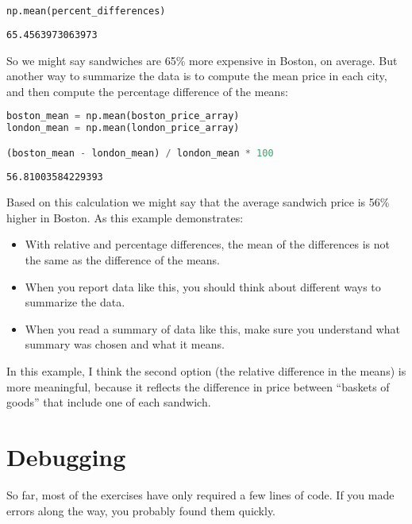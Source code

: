 \begin{lstlisting}[language=Python,style=source]
np.mean(percent_differences)
\end{lstlisting}

\begin{lstlisting}[style=output]
65.4563973063973
\end{lstlisting}

So we might say sandwiches are 65\% more expensive in Boston, on
average. But another way to summarize the data is to compute the mean
price in each city, and then compute the percentage difference of the
means:

\begin{lstlisting}[language=Python,style=source]
boston_mean = np.mean(boston_price_array)
london_mean = np.mean(london_price_array)

(boston_mean - london_mean) / london_mean * 100
\end{lstlisting}

\begin{lstlisting}[style=output]
56.81003584229393
\end{lstlisting}

Based on this calculation we might say that the average sandwich price
is 56\% higher in Boston. As this example demonstrates:

\begin{itemize}
\item
  With relative and percentage differences, the mean of the differences
  is not the same as the difference of the means.
\item
  When you report data like this, you should think about different ways
  to summarize the data.
\item
  When you read a summary of data like this, make sure you understand
  what summary was chosen and what it means.
\end{itemize}

In this example, I think the second option (the relative difference in
the means) is more meaningful, because it reflects the difference in
price between ``baskets of goods'' that include one of each sandwich.

\hypertarget{debugging}{%
\section{Debugging}\label{debugging}}

So far, most of the exercises have only required a few lines of code. If
you made errors along the way, you probably found them quickly.

